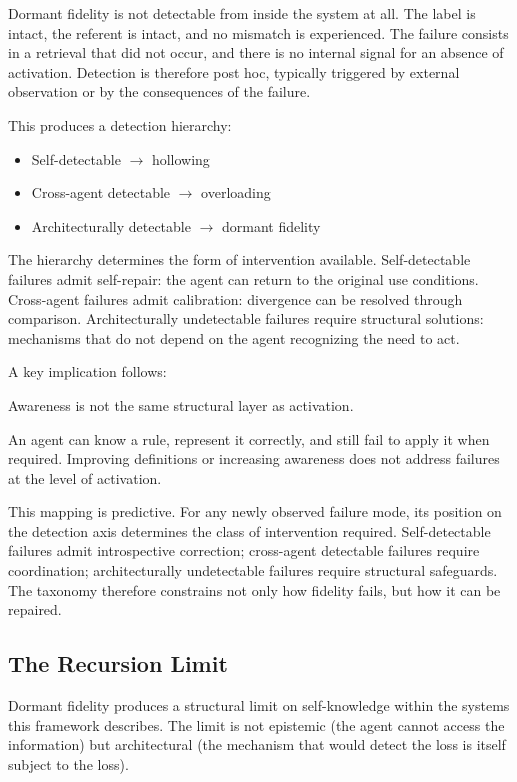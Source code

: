 \documentclass[11pt]{article}
\begin{document}
Dormant fidelity is not detectable from inside the system at all. The label is intact, the referent is intact, and no mismatch is experienced. The failure consists in a retrieval that did not occur, and there is no internal signal for an absence of activation. Detection is therefore post hoc, typically triggered by external observation or by the consequences of the failure.

This produces a detection hierarchy:

\begin{itemize}
\item Self-detectable $\rightarrow$ hollowing
\item Cross-agent detectable $\rightarrow$ overloading
\item Architecturally detectable $\rightarrow$ dormant fidelity
\end{itemize}

The hierarchy determines the form of intervention available. Self-detectable failures admit self-repair: the agent can return to the original use conditions. Cross-agent failures admit calibration: divergence can be resolved through comparison. Architecturally undetectable failures require structural solutions: mechanisms that do not depend on the agent recognizing the need to act.

A key implication follows:

Awareness is not the same structural layer as activation.

An agent can know a rule, represent it correctly, and still fail to apply it when required. Improving definitions or increasing awareness does not address failures at the level of activation.

This mapping is predictive. For any newly observed failure mode, its position on the detection axis determines the class of intervention required. Self-detectable failures admit introspective correction; cross-agent detectable failures require coordination; architecturally undetectable failures require structural safeguards. The taxonomy therefore constrains not only how fidelity fails, but how it can be repaired.

\subsection{The Recursion Limit}

Dormant fidelity produces a structural limit on self-knowledge within the systems this framework describes. The limit is not epistemic (the agent cannot access the information) but architectural (the mechanism that would detect the loss is itself subject to the loss).
\end{document}
